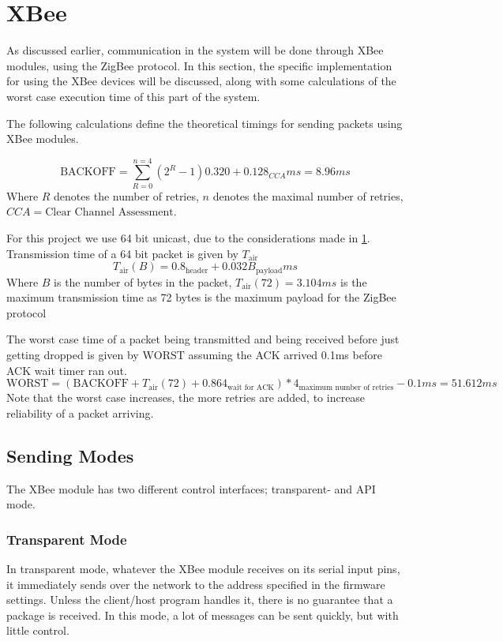 \section{XBee}\label{sec:xbee}
As discussed earlier, communication in the system will be done through XBee modules, using the ZigBee protocol. In this section, the specific implementation for using the XBee devices will be discussed, along with some calculations of the worst case execution time of this part of the system.

The following calculations define the theoretical timings for sending packets using XBee modules.

\begin{equation*}
\text{BACKOFF} = \sum\limits_{R=0}^{n=4}(2^{R} - 1) 0.320 + 0.128_{CCA} ms = 8.96 ms
\end{equation*}
Where $R$ denotes the number of retries, $n$ denotes the maximal number of retries, $CCA = \text{Clear Channel Assessment}$.

For this project we use 64 bit unicast, due to the considerations made in \cref{sec:xbee}.
Transmission time of a 64 bit packet is given by $T_{\text{air}}$
\begin{equation*}
T_{\text{air}}(B) = 0.8_{\text{header}} + 0.032B_{\text{payload}} ms
\end{equation*}
Where $B$ is the number of bytes in the packet, $T_{\text{air}}(72) = 3.104 ms$ is the maximum transmission time as 72 bytes is the maximum payload for the ZigBee protocol\cite{xbee_latency}

The worst case time of a packet being transmitted and being received before just getting dropped is given by $\text{WORST}$ assuming the ACK arrived 0.1ms before ACK wait timer ran out.
\begin{equation*}
\text{WORST} = (\text{BACKOFF} + T_{\text{air}}(72) + 0.864_{\text{wait for ACK}})*4_{\text{maximum number of retries}} - 0.1 ms = 51.612 ms
\end{equation*}
Note that the worst case increases, the more retries are added, to increase reliability of a packet arriving.

\subsection{Sending Modes}
The XBee module has two different control interfaces; transparent- and API mode.
\subsubsection{Transparent Mode}
In transparent mode, whatever the XBee module receives on its serial input pins, it immediately sends over the network to the address specified in the firmware settings. Unless the client/host program handles it, there is no guarantee that a package is received. \cite{arduino_at_mode}
In this mode, a lot of messages can be sent quickly, but with little control.
